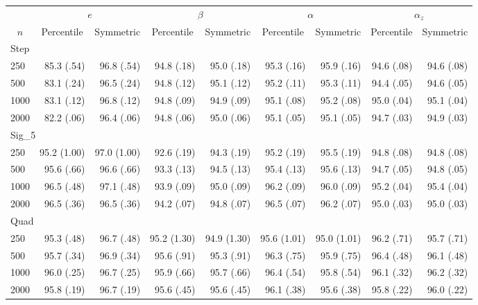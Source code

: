 \begin{tabular}{lrrrrrrrr}
   \hline
 
       &  \multicolumn{2}{c}{$e$}    & \multicolumn{2}{c}{$\beta$}  & \multicolumn{2}{c}{$\alpha$}  & \multicolumn{2}{c}{$\alpha_z$} \\ 
         \multicolumn{1}{c}{$n$} & \multicolumn{1}{c}{Percentile}& \multicolumn{1}{c}{Symmetric}& \multicolumn{1}{c}{Percentile}& \multicolumn{1}{c}{Symmetric}& \multicolumn{1}{c}{Percentile}& \multicolumn{1}{c}{Symmetric}& \multicolumn{1}{c}{Percentile}& \multicolumn{1}{c}{Symmetric} \\ 
         \hline   
 \multicolumn{9}{l}{Step} \\ 
250 & 85.3 (.54) & 96.8 (.54) & 94.8 (.18) & 95.0 (.18) & 95.3 (.16) & 95.9 (.16) & 94.6 (.08) & 94.6 (.08) \\ 
  500 & 83.1 (.24) & 96.5 (.24) & 94.8 (.12) & 95.1 (.12) & 95.2 (.11) & 95.3 (.11) & 94.4 (.05) & 94.6 (.05) \\ 
  1000 & 83.1 (.12) & 96.8 (.12) & 94.8 (.09) & 94.9 (.09) & 95.1 (.08) & 95.2 (.08) & 95.0 (.04) & 95.1 (.04) \\ 
  2000 & 82.2 (.06) & 96.4 (.06) & 94.8 (.06) & 95.0 (.06) & 95.1 (.05) & 95.1 (.05) & 94.7 (.03) & 94.9 (.03) \\ 
       \hline   
 \multicolumn{9}{l}{Sig\_5} \\ 
250 & 95.2 (1.00) & 97.0 (1.00) & 92.6 (.19) & 94.3 (.19) & 95.2 (.19) & 95.5 (.19) & 94.8 (.08) & 94.8 (.08) \\ 
  500 & 95.6 (.66) & 96.6 (.66) & 93.3 (.13) & 94.5 (.13) & 95.4 (.13) & 95.6 (.13) & 94.7 (.05) & 94.8 (.05) \\ 
  1000 & 96.5 (.48) & 97.1 (.48) & 93.9 (.09) & 95.0 (.09) & 96.2 (.09) & 96.0 (.09) & 95.2 (.04) & 95.4 (.04) \\ 
  2000 & 96.5 (.36) & 96.5 (.36) & 94.2 (.07) & 94.8 (.07) & 96.5 (.07) & 96.2 (.07) & 95.0 (.03) & 95.0 (.03) \\ 
       \hline   
 \multicolumn{9}{l}{Quad} \\ 
250 & 95.3 (.48) & 96.7 (.48) & 95.2 (1.30) & 94.9 (1.30) & 95.6 (1.01) & 95.0 (1.01) & 96.2 (.71) & 95.7 (.71) \\ 
  500 & 95.7 (.34) & 96.9 (.34) & 95.6 (.91) & 95.3 (.91) & 96.3 (.75) & 95.9 (.75) & 96.4 (.48) & 96.1 (.48) \\ 
  1000 & 96.0 (.25) & 96.7 (.25) & 95.9 (.66) & 95.7 (.66) & 96.4 (.54) & 95.8 (.54) & 96.1 (.32) & 96.2 (.32) \\ 
  2000 & 95.8 (.19) & 96.7 (.19) & 95.6 (.45) & 95.6 (.45) & 96.1 (.38) & 95.6 (.38) & 95.8 (.22) & 96.0 (.22) \\ 
   \hline
\end{tabular}
